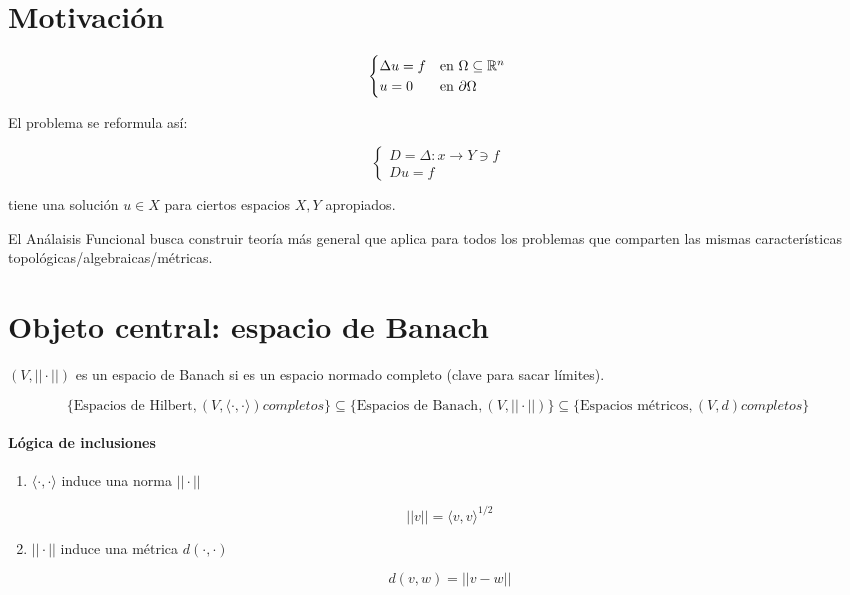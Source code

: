 \section{Motivación}

\begin{fexample}
    \[\begin{cases}
        \Delta u=f&\text{en }\Omega\subseteq \mathbb{R}^n\\
        u=0&\text{en } \partial \Omega
    \end{cases}\]


    El problema se reformula así:

    \[\begin{cases}
        D=\Delta:x\to Y\ni f\\
        Du=f
    \end{cases}\]
    
    tiene una solución $u\in X$ para ciertos espacios $X,Y$ apropiados.
\end{fexample}

El Análaisis Funcional busca construir teoría más general que aplica para todos los problemas que \color{red} comparten \color{black}las \color{red}mismas características \color{black}topológicas/algebraicas/métricas.

\section{Objeto central: espacio de Banach}

\begin{fdefinition}
    $(V,||\cdot ||)$ es un espacio de Banach si es un espacio normado \color{red}completo \color{black}(clave para sacar límites).
\end{fdefinition}

\[\{\text{Espacios de Hilbert}, (V,\langle \cdot,\cdot\rangle) completos\}\subseteq\{\text{Espacios de Banach}, (V,||\cdot||)\}\subseteq \{\text{Espacios métricos}, (V,d) completos\}\]


\paragraph{Lógica de inclusiones}

\begin{enumerate}
    \item $\langle\cdot,\cdot\rangle$ induce una norma $||\cdot||$

    \[||v||=\langle v,v\rangle^{1/2}\]

    \item $||\cdot||$ induce una métrica $d(\cdot,\cdot)$

    \[d(v,w)=||v-w||\]
\end{enumerate}

